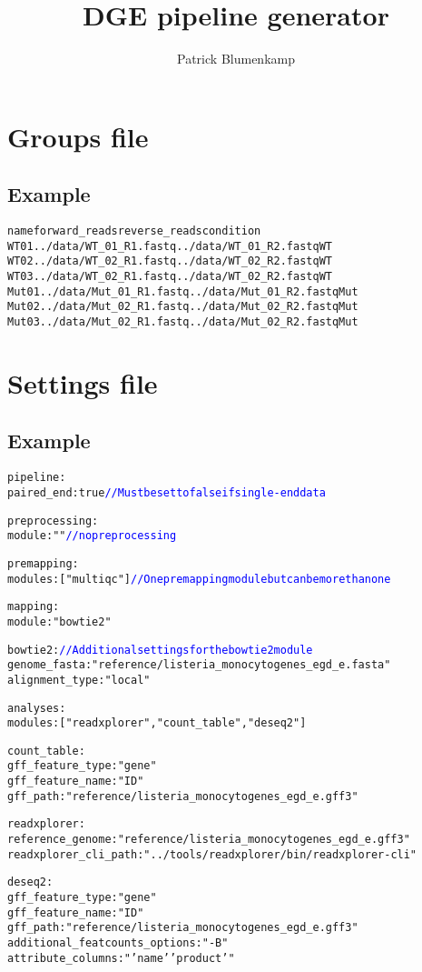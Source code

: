 \documentclass[a4paper]{article}
\title{DGE pipeline generator}
\author{Patrick Blumenkamp}
\begin{document}
\maketitle

\section{Groups file}
\subsection{Example}
\begin{alltt}
name    forward_reads   reverse_reads   condition
WT01    ../data/WT_01_R1.fastq     ../data/WT_01_R2.fastq     WT
WT02    ../data/WT_02_R1.fastq     ../data/WT_02_R2.fastq     WT
WT03    ../data/WT_02_R1.fastq     ../data/WT_02_R2.fastq     WT
Mut01    ../data/Mut_01_R1.fastq     ../data/Mut_01_R2.fastq     Mut
Mut02    ../data/Mut_02_R1.fastq     ../data/Mut_02_R2.fastq     Mut
Mut03    ../data/Mut_02_R1.fastq     ../data/Mut_02_R2.fastq     Mut
	
\end{alltt}
\section{Settings file}
\subsection{Example}
\begin{alltt}
pipeline:
paired_end: true		\textcolor{blue}{//Must be set to false if single-end data}

preprocessing:
module: ""		\textcolor{blue}{//no preprocessing}

premapping:
modules: ["multiqc"]		\textcolor{blue}{//One premapping module but can be more than one}

mapping:
module: "bowtie2"

bowtie2:	\textcolor{blue}{//Additional settings for the bowtie2 module}
genome_fasta: "reference/listeria_monocytogenes_egd_e.fasta"
alignment_type: "local"

analyses:
modules: ["readxplorer", "count_table", "deseq2"]

count_table:
gff_feature_type: "gene"
gff_feature_name: "ID"
gff_path: "reference/listeria_monocytogenes_egd_e.gff3"

readxplorer:
reference_genome: "reference/listeria_monocytogenes_egd_e.gff3"
readxplorer_cli_path: "../tools/readxplorer/bin/readxplorer-cli"

deseq2:
gff_feature_type: "gene"
gff_feature_name: "ID"
gff_path: "reference/listeria_monocytogenes_egd_e.gff3"
additional_featcounts_options: "-B"
attribute_columns: "'name' 'product'"

\end{alltt}
\end{document}
